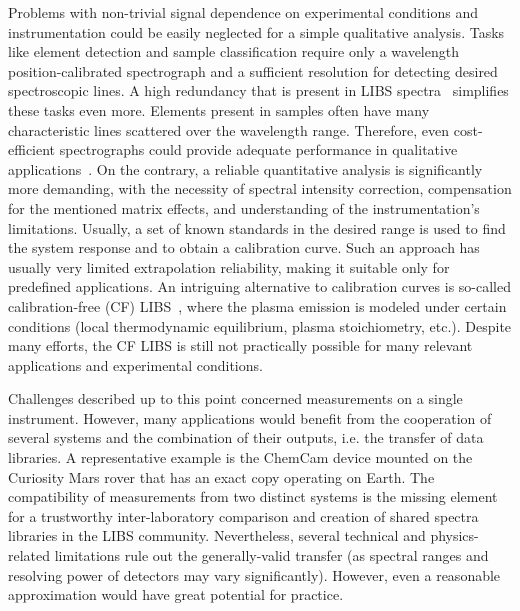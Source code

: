 \documentclass[preprint,11pt]{elsarticle}
\begin{document}
Problems with non-trivial signal dependence on experimental conditions and instrumentation could be easily neglected for a simple qualitative analysis. Tasks like element detection and sample classification require only a wavelength position-calibrated spectrograph and a sufficient resolution for detecting desired spectroscopic lines. A high redundancy that is present in LIBS spectra~\cite{VRABEL_RBM} simplifies these tasks even more. Elements present in samples often have many characteristic lines scattered over the wavelength range. Therefore, even cost-efficient spectrographs could provide adequate performance in qualitative applications~\cite{VRABEL_SVM}. On the contrary, a reliable quantitative analysis is significantly more demanding, with the necessity of spectral intensity correction, compensation for the mentioned matrix effects, and understanding of the instrumentation's limitations. Usually, a set of known standards in the desired range is used to find the system response and to obtain a calibration curve. Such an approach has usually very limited extrapolation reliability, making it suitable only for predefined applications. An intriguing alternative to calibration curves is so-called calibration-free (CF) LIBS~\cite{Ciucci_CF}, where the plasma emission is modeled under certain conditions (local thermodynamic equilibrium, plasma stoichiometry, etc.). Despite many efforts, the CF LIBS is still not practically possible for many relevant applications and experimental conditions.

Challenges described up to this point concerned measurements on a single instrument. However, many applications would benefit from the cooperation of several systems and the combination of their outputs, i.e. the transfer of data libraries. A representative example is the ChemCam device mounted on the Curiosity Mars rover that has an exact copy operating on Earth. The compatibility of measurements from two distinct systems is the missing element for a trustworthy inter-laboratory comparison and creation of shared spectra libraries in the LIBS community. Nevertheless, several technical and physics-related limitations rule out the generally-valid transfer (as spectral ranges and resolving power of detectors may vary significantly). However, even a reasonable approximation would have great potential for practice.
\end{document}
